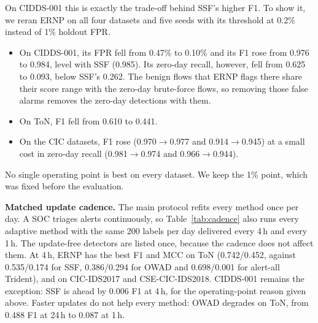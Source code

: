 \documentclass[a4paper,fleqn]{cas-dc}
\newcommand{\ERNP}{ERNP\xspace}
\begin{document}
On CIDDS-001 this is exactly the trade-off behind SSF's higher F1. To show it, we reran \ERNP on all four datasets and five seeds with its threshold at 0.2\% instead of 1\% holdout FPR.
\begin{itemize}
  \item On CIDDS-001, its FPR fell from 0.47\% to 0.10\% and its F1 rose from 0.976 to 0.984, level with SSF (0.985). Its zero-day recall, however, fell from 0.625 to 0.093, below SSF's 0.262. The benign flows that \ERNP flags there share their score range with the zero-day brute-force flows, so removing those false alarms removes the zero-day detections with them.
  \item On ToN, F1 fell from 0.610 to 0.441.
  \item On the CIC datasets, F1 rose (0.970$\rightarrow$0.977 and 0.914$\rightarrow$0.945) at a small cost in zero-day recall (0.981$\rightarrow$0.974 and 0.966$\rightarrow$0.944).
\end{itemize}
No single operating point is best on every dataset. We keep the 1\% point, which was fixed before the evaluation.

\begin{table}[t]
\centering
\caption{Zero-day recall (ZD rec.) and FPR at each method's own decision rule (mean over five seeds, causal protocol, $B=200$). $^\star$: Pareto-optimal on that dataset, i.e.\ no other method has both higher zero-day recall and lower FPR.}
\label{tab:zdfpr}
\scriptsize

\end{table}

\textbf{Matched update cadence.} The main protocol refits every method once per day. A SOC triages alerts continuously, so Table~\ref{tab:cadence} also runs every adaptive method with the same 200 labels per day delivered every 4\,h and every 1\,h. The update-free detectors are listed once, because the cadence does not affect them. At 4\,h, \ERNP has the best F1 and MCC on ToN (0.742/0.452, against 0.535/0.174 for SSF, 0.386/0.294 for OWAD and 0.698/0.001 for alert-all Trident), and on CIC-IDS2017 and CSE-CIC-IDS2018. CIDDS-001 remains the exception: SSF is ahead by 0.006 F1 at 4\,h, for the operating-point reason given above. Faster updates do not help every method: OWAD degrades on ToN, from 0.488 F1 at 24\,h to 0.087 at 1\,h.

\begin{table}[t]
\centering
\caption{RQ1 at matched update cadence: the same 200 labels per day, delivered every 24, 4 or 1\,h (mean over seeds 0--2). CADE, Trident and MemStream do not use labels and are cadence-independent. Bold: best per column.}
\label{tab:cadence}
\scriptsize

\end{table}
\end{document}
